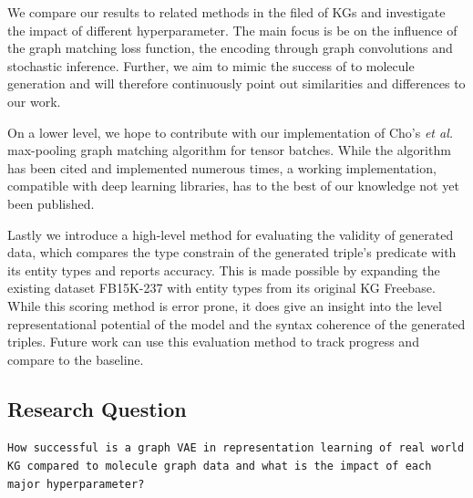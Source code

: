We compare our results to related methods in the filed of KGs and investigate the impact of different hyperparameter. The main focus is be on the influence of the graph matching loss function, the encoding through graph convolutions and stochastic inference. Further, we aim to mimic the success of to molecule generation and will therefore continuously point out similarities and differences to our work.

On a lower level, we hope to contribute with our implementation of Cho's \textit{et al.} max-pooling graph matching algorithm for tensor batches. While the algorithm has been cited and implemented numerous times, a working implementation, compatible with deep learning libraries, has to the best of our knowledge not yet been published.  

Lastly we introduce a high-level method for evaluating the validity of generated data, which compares the type constrain of the generated triple's predicate with its entity types and reports accuracy. This is made possible by expanding the existing dataset FB15K-237 with entity types from its original KG Freebase. While this scoring method is error prone, it does give an insight into the level representational potential of the model and the syntax coherence of the generated triples. Future work can use this evaluation method to track progress and compare to the baseline. 



\subsection{Research Question}

\begin{center}
    \texttt{How successful is a graph VAE in representation learning of real world KG compared to molecule graph data and what is the impact of each major hyperparameter?}
    \label{sec1:requestion}
\end{center}


